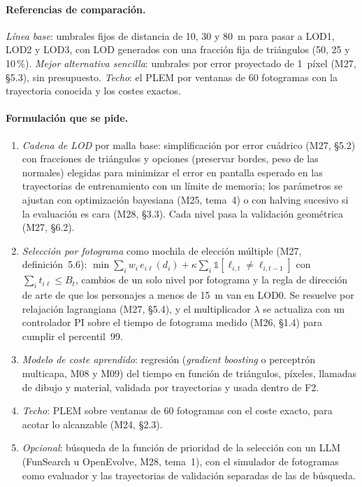 \paragraph{Referencias de comparación.} \emph{Línea base}: umbrales fijos de distancia de 10, 30 y 80~m para pasar a LOD1, LOD2 y LOD3, con LOD generados con una fracción fija de triángulos (50, 25 y 10\,\%). \emph{Mejor alternativa sencilla}: umbrales por error proyectado de 1~píxel (M27, §5.3), sin presupuesto. \emph{Techo}: el PLEM por ventanas de 60 fotogramas con la trayectoria conocida y los costes exactos.

\paragraph{Formulación que se pide.}
\begin{enumerate}[label=F\arabic*.]
  \item \emph{Cadena de LOD} por malla base: simplificación por error cuádrico (M27, §5.2) con fracciones de triángulos y opciones (preservar bordes, peso de las normales) elegidas para minimizar el error en pantalla esperado en las trayectorias de entrenamiento con un límite de memoria; los parámetros se ajustan con optimización bayesiana (M25, tema~4) o con halving sucesivo si la evaluación es cara (M28, §3.3). Cada nivel pasa la validación geométrica (M27, §6.2).
  \item \emph{Selección por fotograma} como mochila de elección múltiple (M27, definición~5.6): $\min\sum_iw_i\,e_{i\ell}(d_i)+\kappa\sum_i\mathbb{1}[\ell_{i,t}\ne\ell_{i,t-1}]$ con $\sum_it_{i\ell}\le B_t$, cambios de un solo nivel por fotograma y la regla de dirección de arte de que los personajes a menos de 15~m van en LOD0. Se resuelve por relajación lagrangiana (M27, §5.4), y el multiplicador $\lambda$ se actualiza con un controlador PI sobre el tiempo de fotograma medido (M26, §1.4) para cumplir el percentil~99.
  \item \emph{Modelo de coste aprendido}: regresión (\emph{gradient boosting} o perceptrón multicapa, M08 y M09) del tiempo en función de triángulos, píxeles, llamadas de dibujo y material, validada por trayectorias y usada dentro de F2.
  \item \emph{Techo}: PLEM sobre ventanas de 60 fotogramas con el coste exacto, para acotar lo alcanzable (M24, §2.3).
  \item \emph{Opcional}: búsqueda de la función de prioridad de la selección con un LLM (FunSearch u OpenEvolve, M28, tema~1), con el simulador de fotogramas como evaluador y las trayectorias de validación separadas de las de búsqueda.
\end{enumerate}

